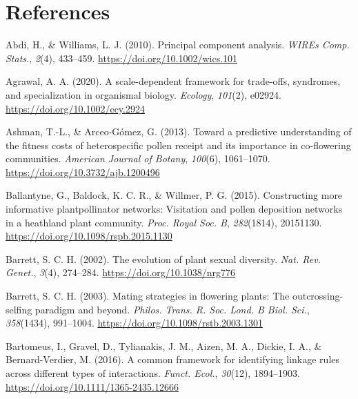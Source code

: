 \documentclass[
  12pt,
  a4paper,
]{article}
\newlength{\cslhangindent}
\newlength{\cslentryspacingunit} %
\newenvironment{CSLReferences}[2] %
 {%
  \setlength{\parindent}{0pt}
  \ifodd #1
  \let\oldpar\par
  \def\par{\hangindent=\cslhangindent\oldpar}
  \fi
  \setlength{\parskip}{#2\cslentryspacingunit}
 }%
 {}
\begin{document}
\newpage

\hypertarget{references}{%
\section{References}\label{references}}

\hypertarget{refs}{}
\begin{CSLReferences}{1}{0}
\leavevmode{}%
Abdi, H., \& Williams, L. J. (2010). Principal component analysis. \emph{WIREs Comp. Stats.}, \emph{2}(4), 433--459. \url{https://doi.org/10.1002/wics.101}

\leavevmode{}%
Agrawal, A. A. (2020). A scale-dependent framework for trade-offs, syndromes, and specialization in organismal biology. \emph{Ecology}, \emph{101}(2), e02924. \url{https://doi.org/10.1002/ecy.2924}

\leavevmode{}%
Ashman, T.-L., \& Arceo-Gómez, G. (2013). Toward a predictive understanding of the fitness costs of heterospecific pollen receipt and its importance in co-flowering communities. \emph{American Journal of Botany}, \emph{100}(6), 1061--1070. \url{https://doi.org/10.3732/ajb.1200496}

\leavevmode{}%
Ballantyne, G., Baldock, K. C. R., \& Willmer, P. G. (2015). Constructing more informative plant\textendash pollinator networks: Visitation and pollen deposition networks in a heathland plant community. \emph{Proc. Royal Soc. B}, \emph{282}(1814), 20151130. \url{https://doi.org/10.1098/rspb.2015.1130}

\leavevmode{}%
Barrett, S. C. H. (2002). The evolution of plant sexual diversity. \emph{Nat. Rev. Genet.}, \emph{3}(4), 274--284. \url{https://doi.org/10.1038/nrg776}

\leavevmode{}%
Barrett, S. C. H. (2003). Mating strategies in flowering plants: The outcrossing-selfing paradigm and beyond. \emph{Philos. Trans. R. Soc. Lond. B Biol. Sci.}, \emph{358}(1434), 991--1004. \url{https://doi.org/10.1098/rstb.2003.1301}

\leavevmode{}%
Bartomeus, I., Gravel, D., Tylianakis, J. M., Aizen, M. A., Dickie, I. A., \& Bernard-Verdier, M. (2016). A common framework for identifying linkage rules across different types of interactions. \emph{Funct. Ecol.}, \emph{30}(12), 1894--1903. \url{https://doi.org/10.1111/1365-2435.12666}


\end{CSLReferences}
\end{document}
